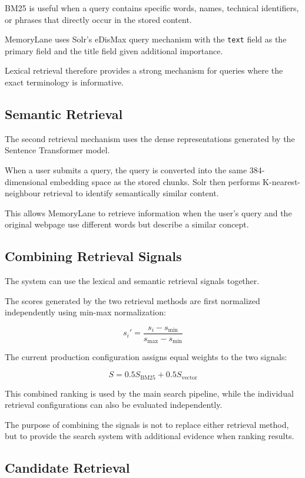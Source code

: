 \documentclass{tietreport}
\begin{document}
BM25 is useful when a query contains specific words, names,
technical identifiers, or phrases that directly occur in the
stored content.

MemoryLane uses Solr's eDisMax query mechanism with the
\texttt{text} field as the primary field and the title field
given additional importance.

Lexical retrieval therefore provides a strong mechanism for
queries where the exact terminology is informative.

\subsection{Semantic Retrieval}

The second retrieval mechanism uses the dense representations
generated by the Sentence Transformer model.

When a user submits a query, the query is converted into the
same 384-dimensional embedding space as the stored chunks.
Solr then performs K-nearest-neighbour retrieval to identify
semantically similar content.

This allows MemoryLane to retrieve information when the user's
query and the original webpage use different words but describe
a similar concept.

\subsection{Combining Retrieval Signals}

The system can use the lexical and semantic retrieval signals
together.

The scores generated by the two retrieval methods are first
normalized independently using min-max normalization:

\[
s_i' =
\frac{s_i-s_{\min}}
{s_{\max}-s_{\min}}
\]

The current production configuration assigns equal weights to
the two signals:

\[
S =
0.5S_{\mathrm{BM25}}
+
0.5S_{\mathrm{vector}}
\]

This combined ranking is used by the main search pipeline,
while the individual retrieval configurations can also be
evaluated independently.

The purpose of combining the signals is not to replace either
retrieval method, but to provide the search system with
additional evidence when ranking results.

\subsection{Candidate Retrieval}
\end{document}
